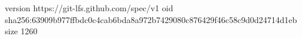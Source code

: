 version https://git-lfs.github.com/spec/v1
oid sha256:63909b977ffbdc0c4cab6bda8a972b7429080c876429f46c58c9d0d24714d1eb
size 1260
